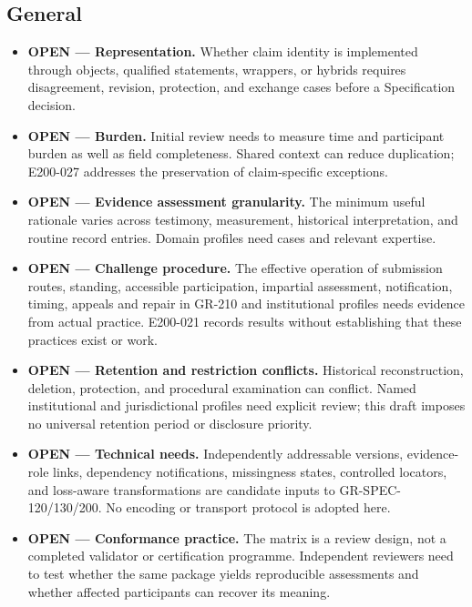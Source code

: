 \documentclass[11pt,a4paper]{article}
\begin{document}
\subsection{General}

\begin{itemize}
\item \textbf{OPEN --- Representation.} Whether claim identity is implemented through objects, qualified statements, wrappers, or hybrids requires disagreement, revision, protection, and exchange cases before a Specification decision.
\item \textbf{OPEN --- Burden.} Initial review needs to measure time and participant burden as well as field completeness. Shared context can reduce duplication; E200-027 addresses the preservation of claim-specific exceptions.
\item \textbf{OPEN --- Evidence assessment granularity.} The minimum useful rationale varies across testimony, measurement, historical interpretation, and routine record entries. Domain profiles need cases and relevant expertise.
\item \textbf{OPEN --- Challenge procedure.} The effective operation of submission routes, standing, accessible participation, impartial assessment, notification, timing, appeals and repair in GR-210 and institutional profiles needs evidence from actual practice. E200-021 records results without establishing that these practices exist or work.
\item \textbf{OPEN --- Retention and restriction conflicts.} Historical reconstruction, deletion, protection, and procedural examination can conflict. Named institutional and jurisdictional profiles need explicit review; this draft imposes no universal retention period or disclosure priority.
\item \textbf{OPEN --- Technical needs.} Independently addressable versions, evidence-role links, dependency notifications, missingness states, controlled locators, and loss-aware transformations are candidate inputs to GR-SPEC-120/130/200. No encoding or transport protocol is adopted here.
\item \textbf{OPEN --- Conformance practice.} The matrix is a review design, not a completed validator or certification programme. Independent reviewers need to test whether the same package yields reproducible assessments and whether affected participants can recover its meaning.
\end{itemize}
\end{document}
